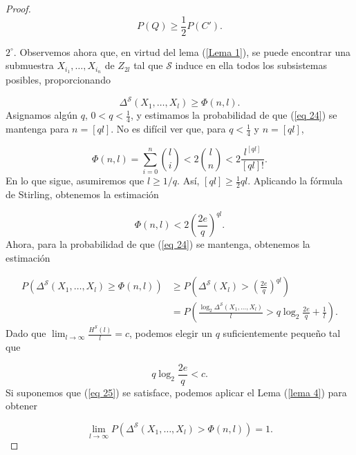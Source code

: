 \documentclass{report}
\begin{document}
\begin{proof}
\begin{equation*}
P(Q) \geq \frac{1}{2} P(C').
\end{equation*}

\bigskip
\( 2^\circ \). Observemos ahora que, en virtud del lema (\ref{Lema 1}), se puede encontrar una submuestra \( X_{i_1}, \dots, X_{i_n} \) de \( Z_{2l} \) tal que \( \mathcal{S} \) induce en ella todos los subsistemas posibles, proporcionando

\begin{equation}\label{eq 24}
\Delta^{\mathcal{S}}(X_1, \dots, X_l) \geq \Phi(n, l).
\end{equation}
Asignamos algún \( q \), \( 0 < q < \frac{1}{4} \), y estimamos la probabilidad de que (\ref{eq 24}) se mantenga para \( n = [ ql ] \). No es difícil ver que, para \( q < \frac{1}{4} \) y \( n = [ ql ] \),

\begin{equation*}
\Phi(n, l) = \sum_{i=0}^{n} \binom{l}{i} < 2 \binom{l}{n} < 2 \frac{l^{[ ql ]}}{[ ql ] !}.
\end{equation*}
En lo que sigue, asumiremos que \( l \geq 1/q \). Así, \( [ ql ] \geq \frac{1}{2} ql \). Aplicando la fórmula de Stirling, obtenemos la estimación

\begin{equation*}
\Phi(n, l) < 2 \left( \frac{2e}{q} \right)^{ql}.
\end{equation*}
Ahora, para la probabilidad de que (\ref{eq 24}) se mantenga, obtenemos la estimación

\begin{align*}
P \left( \Delta^{\mathcal{S}}(X_1, \dots, X_l) \geq \Phi(n, l) \right) 
&\geq P \left( \Delta^{\mathcal{S}}(X_l) > \left( \frac{2e}{q} \right)^{ql} \right) \\
&= P \left( \frac{\log_2 \Delta^{\mathcal{S}}(X_1, \dots, X_l)}{l} > q \log_2 \frac{2e}{q} + \frac{1}{l} \right).
\end{align*}
Dado que \( \lim_{l \to \infty} \frac{H^{\mathcal{S}}(l)}{l} = c \), podemos elegir un \( q \) suficientemente pequeño tal que

\begin{equation}\label{eq 25}
q \log_2 \frac{2e}{q} < c.
\end{equation}
Si suponemos que (\ref{eq 25}) se satisface, podemos aplicar el Lema (\ref{lema 4}) para obtener

\begin{equation}\label{eq 26}
\lim_{l \to \infty} P \left( \Delta^{\mathcal{S}}(X_1, \dots, X_l) > \Phi(n, l) \right) = 1.
\end{equation}


\end{proof}
\end{document}
